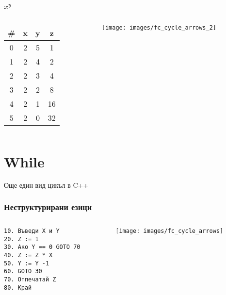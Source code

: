 \documentclass{beamer}
\begin{document}
\begin{frame}[fragile]
\frametitle{$x^y$}


\begin{columns}[c]
  \begin{column}{0.3\textwidth}
\begin{tabular}{ c | c | c | c  }
\hline
\# & x & y & z \\\hline
0 & 2 & 5 & 1 \\\hline
1 & 2 & 4 & 2 \\\hline
2 & 2 & 3 & 4 \\\hline
3 & 2 & 2 & 8 \\\hline
4 & 2 & 1 & 16 \\\hline
5 & 2 & 0 & 32 \\\hline
  
\end{tabular}

  \end{column}
  \begin{column}{0.7\textwidth}

\hspace*{-90pt}
\texttt{[image: images/fc\_cycle\_arrows\_2]} 


  \end{column}
\end{columns}


\end{frame}

\section{While} 


\begin{frame}
\centerline{Още един вид цикъл в C++}
\end{frame}


\begin{frame}[fragile]
\frametitle{Неструктурирани езици}

\begin{columns}[t]
  \begin{column}{0.3\textwidth}

\begin{verbatim}
10. Въведи X и Y
20. Z := 1
30. Ако Y == 0 GOTO 70
40. Z := Z * X
50. Y := Y -1
60. GOTO 30
70. Отпечатай Z
80. Край   
\end{verbatim}

  \end{column}
  \begin{column}{0.7\textwidth}

\hspace*{-90pt}
\texttt{[image: images/fc\_cycle\_arrows]} 


  \end{column}
\end{columns}


\end{frame}
\end{document}
